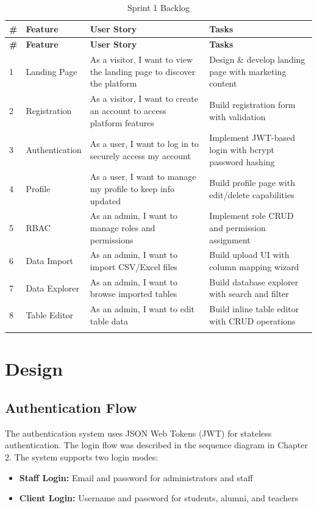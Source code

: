 \documentclass[12pt,a4paper]{report}
\begin{document}
\begin{table}[H]\begin{tabular}{|p{0.5cm}|p{2.5cm}|p{4cm}|p{2.5cm}|}
\hline
\textbf{\#} & \textbf{Feature} & \textbf{User Story} & \textbf{Tasks} \\
\hline

\hline
\textbf{\#} & \textbf{Feature} & \textbf{User Story} & \textbf{Tasks} \\
\hline

1 & Landing Page & As a visitor, I want to view the landing page to discover the platform & Design \& develop landing page with marketing content \\
2 & Registration & As a visitor, I want to create an account to access platform features & Build registration form with validation \\
3 & Authentication & As a user, I want to log in to securely access my account & Implement JWT-based login with bcrypt password hashing \\
4 & Profile & As a user, I want to manage my profile to keep info updated & Build profile page with edit/delete capabilities \\
5 & RBAC & As an admin, I want to manage roles and permissions & Implement role CRUD and permission assignment \\
6 & Data Import & As an admin, I want to import CSV/Excel files & Build upload UI with column mapping wizard \\
7 & Data Explorer & As an admin, I want to browse imported tables & Build database explorer with search and filter \\
8 & Table Editor & As an admin, I want to edit table data & Build inline table editor with CRUD operations \\
\hline
\caption{Sprint 1 Backlog}
\end{tabular}\end{table}

\section{Design}

\subsection{Authentication Flow}

The authentication system uses JSON Web Tokens (JWT) for stateless authentication. The login flow was described in the sequence diagram in Chapter 2. The system supports two login modes:
\begin{itemize}
    \item \textbf{Staff Login:} Email and password for administrators and staff
    \item \textbf{Client Login:} Username and password for students, alumni, and teachers
\end{itemize}
\end{document}
